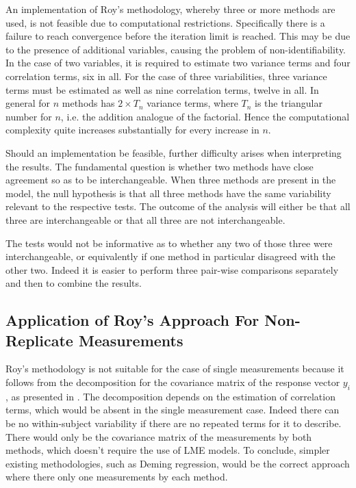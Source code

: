 \documentclass[12pt, a4paper]{report}
\theoremstyle{plain}
\theoremstyle{definition}
\theoremstyle{remark}
\begin{document}
An implementation of Roy's methodology, whereby three or more methods are used, is not feasible due to computational restrictions. Specifically there is a failure to reach convergence before the iteration limit is reached. This may be due to the presence of additional variables, causing the problem of non-identifiability. In the case of two variables, it is required to estimate two variance terms and four correlation terms, six in all. For the case of three variabilities, three variance terms must be estimated as well as nine correlation terms, twelve in all. In general for $n$ methods has $2 \times T_{n}$ variance terms, where $T_n$ is the triangular number for $n$, i.e. the addition analogue of the factorial. Hence the computational complexity quite increases substantially for every increase in $n$.

Should an implementation be feasible, further difficulty arises when interpreting the results. The fundamental question is whether two methods have close agreement so as to be interchangeable. When three methods are present in the model, the null hypothesis is that all three methods have the same variability relevant to the respective tests. The outcome of the analysis will either be that all three are interchangeable or that all three are not interchangeable.

The tests would not be informative as to whether any two of those three were interchangeable, or equivalently if one method in particular disagreed with the other two. Indeed it is easier to perform three pair-wise comparisons separately and then to combine the results.



\subsection{Application of Roy's Approach For Non-Replicate Measurements}

Roy's methodology is not suitable for the case of single measurements because it follows from the decomposition for the covariance matrix of the response vector $y_{i}$, as presented in \citet{hamlett}. The decomposition depends on the estimation of correlation terms, which would be absent in the single measurement case. Indeed there can be no within-subject variability if there are no repeated terms for it to describe. There would only be the covariance matrix of the measurements by both methods, which doesn't require the use of LME models. To conclude, simpler existing methodologies, such as Deming regression, would be the correct approach where there only one measurements by each method.
\end{document}
